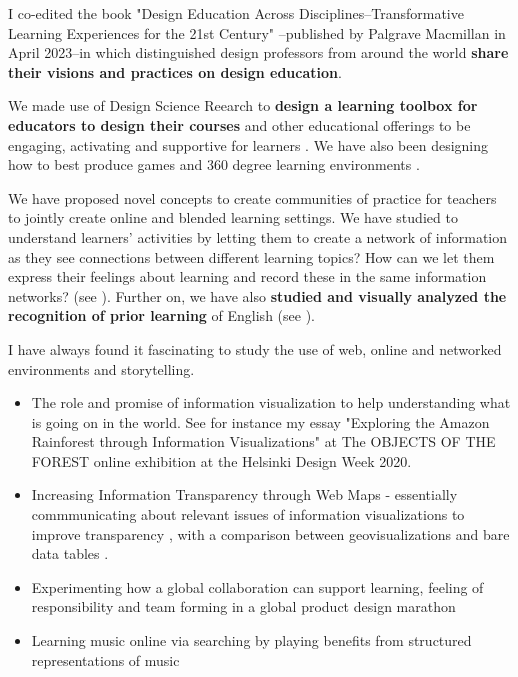 \documentclass[11pt,letterpaper]{article}
\begin{document}
I co-edited the book "Design Education Across Disciplines--Transformative Learning Experiences for the 21st Century" \cite{DesignEducation2023}--published by Palgrave Macmillan in April 2023--in which distinguished design professors from around the world \textbf{share their visions and practices on design education}.

We made use of Design Science Reearch to \textbf{design a learning toolbox for educators to design their courses} and other educational offerings to be engaging, activating and supportive for learners \cite{designing-toolbox-2022}. We have also been designing how to best produce games \cite{gamejams-2021,game-production-2022,Promotypes2023,templating-games-2024} and 360 degree learning environments \cite{production-pipeline-360}. 


We have proposed novel concepts to 
     create communities of practice for teachers to jointly create online and blended
     learning settings. We have studied to understand learners' activities by
     letting them to create a network of information as they see connections
     between different learning topics? How can we let them express their
     feelings about learning and record these in the same information networks?
     (see \cite{visual-self-assessment-2018}). Further on, we have also 
     \textbf{studied and visually analyzed the recognition of prior learning} of English
     (see \cite{rpl-test-or-assess-2019}).



 I have always found it fascinating to study the use of web, online and
  networked environments and storytelling. 
   \begin{itemize}
    \item The role and promise of information visualization to help understanding what is going on in the world. See for instance my essay "Exploring the Amazon Rainforest through Information Visualizations" \cite{exploration-2020} at The OBJECTS OF THE FOREST online exhibition at the Helsinki Design Week 2020.

    \item Increasing Information Transparency through Web Maps -
   essentially commmunicating about relevant issues of information
   visualizations to improve transparency \cite{AW4city2018}, with a comparison
   between geovisualizations and bare data tables
   \cite{geoviz-data-tables-2018}.
    \item Experimenting how a global collaboration can support learning,
    feeling of responsibility and team forming in a global product design
    marathon \cite{global-design-relay-2017}
    \item Learning music online via searching by playing benefits from
     structured representations of music \cite{MusicOWL-2017}


  \end{itemize}
\end{document}
